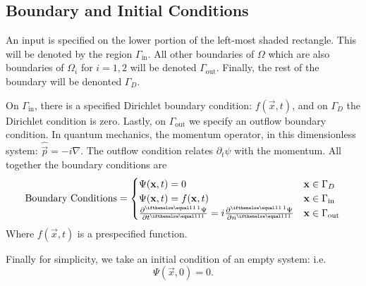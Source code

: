 \documentclass[../../main.tex]{subfiles}
\begin{document}
\subsection{Boundary and Initial Conditions}

An input is specified on the lower portion of the left-most 
shaded rectangle.  
This will be denoted by the region $\Gamma_\mathrm{in}$.  
All other boundaries of $\Omega$ which are also boundaries of 
$\Omega_i$ for $i = 1, 2$ will be denoted 
$\Gamma_\mathrm{out}$.  
Finally, the rest of the boundary will be denonted $\Gamma_D$.  

On $\Gamma_\mathrm{in}$, there is a specified Dirichlet boundary condition:
$f(\vec x, t)$, and on $\Gamma_D$ the Dirichlet condition is zero.
Lastly, on $\Gamma_\mathrm{out}$ we specify an outflow boundary condition.
In quantum mechanics, the momentum operator, 
in this dimensionless system: $\hat{\vec p} = -i  \nabla$.
The outflow condition relates $\partial_t \psi$ with the momentum. 
All together the boundary conditions are
\begin{equation}
		\label{eq:boundary-conditions}
		\text{Boundary Conditions} = 
		\begin{cases}
				\Psi(\vec x, t) = 0 & \vec x \in \Gamma_D \\
				\Psi(\vec x, t) = f(\vec x, t) & \vec x \in \Gamma_\mathrm{in}
				\\
				\pder{\Psi}{t} = i  \pder{\Psi}{n} & 
				\vec x \in \Gamma_\mathrm{out}
		\end{cases}
\end{equation}
Where $f(\vec x, t)$ is a prespecified function.

Finally for simplicity, we take an initial condition of 
an empty system: i.e.
\[
		\Psi(\vec x, 0) = 0
.\] 
\end{document}
